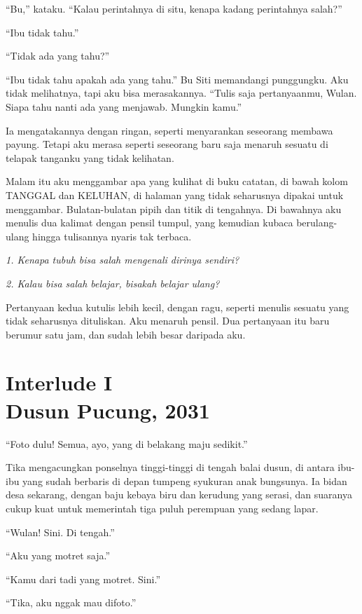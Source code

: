 \documentclass[11pt,twoside,openany]{book}
\makeatletter
\newcommand{\scenebreak}{\par\vspace{0.9em}{\centering\textsc{*\hspace{0.7em}*\hspace{0.7em}*}\par}\vspace{0.9em}\@afterindentfalse\@afterheading}
\makeatother
\begin{document}
``Bu,'' kataku. ``Kalau perintahnya di situ, kenapa kadang perintahnya salah?''

``Ibu tidak tahu.''

``Tidak ada yang tahu?''

``Ibu tidak tahu apakah ada yang tahu.'' Bu Siti memandangi punggungku. Aku tidak melihatnya, tapi aku bisa merasakannya. ``Tulis saja pertanyaanmu, Wulan. Siapa tahu nanti ada yang menjawab. Mungkin kamu.''

Ia mengatakannya dengan ringan, seperti menyarankan seseorang membawa payung. Tetapi aku merasa seperti seseorang baru saja menaruh sesuatu di telapak tanganku yang tidak kelihatan.

\scenebreak
Malam itu aku menggambar apa yang kulihat di buku catatan, di bawah kolom TANGGAL dan KELUHAN, di halaman yang tidak seharusnya dipakai untuk menggambar. Bulatan-bulatan pipih dan titik di tengahnya. Di bawahnya aku menulis dua kalimat dengan pensil tumpul, yang kemudian kubaca berulang-ulang hingga tulisannya nyaris tak terbaca.

\emph{1. Kenapa tubuh bisa salah mengenali dirinya sendiri?}

\emph{2. Kalau bisa salah belajar, bisakah belajar ulang?}

Pertanyaan kedua kutulis lebih kecil, dengan ragu, seperti menulis sesuatu yang tidak seharusnya dituliskan. Aku menaruh pensil. Dua pertanyaan itu baru berumur satu jam, dan sudah lebih besar daripada aku.

\chapter*{Interlude I\\[0.5em]\normalsize\upshape Dusun Pucung, 2031}
``Foto dulu! Semua, ayo, yang di belakang maju sedikit.''

Tika mengacungkan ponselnya tinggi-tinggi di tengah balai dusun, di antara ibu-ibu yang sudah berbaris di depan tumpeng syukuran anak bungsunya. Ia bidan desa sekarang, dengan baju kebaya biru dan kerudung yang serasi, dan suaranya cukup kuat untuk memerintah tiga puluh perempuan yang sedang lapar.

``Wulan! Sini. Di tengah.''

``Aku yang motret saja.''

``Kamu dari tadi yang motret. Sini.''

``Tika, aku nggak mau difoto.''
\end{document}
